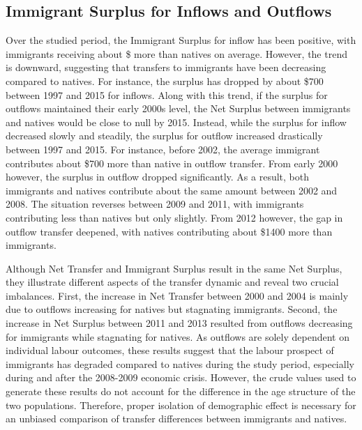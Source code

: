 \subsection{Immigrant Surplus for Inflows and Outflows}
Over the studied period, the Immigrant Surplus for inflow has been positive, with immigrants receiving about \$ more than natives on average.
However, the trend is downward, suggesting that transfers to immigrants have been decreasing compared to natives.
For instance, the surplus has dropped by about \$700 between 1997 and 2015 for inflows. Along with this trend, if the surplus for outflows maintained their early 2000s level, the Net Surplus between immigrants and natives would be close to null by 2015.
Instead, while the surplus for inflow decreased slowly and steadily, the surplus for outflow increased drastically between 1997 and 2015.
For instance, before 2002, the average immigrant contributes about \$700 more than native in outflow transfer.
From early 2000 however, the surplus in outflow dropped significantly. As a result, both immigrants and natives contribute about the same amount between 2002 and 2008.
The situation reverses between 2009 and 2011, with immigrants contributing less than natives but only slightly.
From 2012 however, the gap in outflow transfer deepened, with natives contributing about \$1400 more than immigrants.

\vspace{0.7em}\par
Although Net Transfer and Immigrant Surplus result in the same Net Surplus, they illustrate different aspects of the transfer dynamic and reveal two crucial imbalances.
First, the increase in Net Transfer between 2000 and 2004 is mainly due to outflows increasing for natives but stagnating immigrants.
Second, the increase in Net Surplus between 2011 and 2013 resulted from outflows decreasing for immigrants while stagnating for natives.
As outflows are solely dependent on individual labour outcomes, these results suggest that the labour prospect of immigrants has degraded compared to natives during the study period, especially during and after the 2008-2009 economic crisis.
However, the crude values used to generate these results do not account for the difference in the age structure of the two populations.
Therefore, proper isolation of demographic effect is necessary for an unbiased comparison of transfer differences between immigrants and natives.















